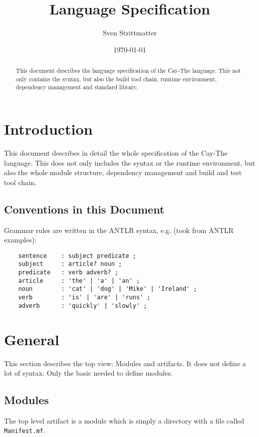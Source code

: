 \documentclass[a4paper,12pt]{article}
\title{Language Specification}
\author{Sven Strittmatter}
\date{\today}
\begin{document}
\maketitle
\begin{abstract}
    This document describes the language specification of the Cay-The language. This not only contains the syntax, but also the build tool chain, runtime environment, dependency management and standard library.
\end{abstract}
\clearpage

\tableofcontents
\clearpage

\section{Introduction}

This document describes in detail the whole specification of the Cay-The language. This does not only includes the syntax or the runtime environment, but also the whole module structure, dependency management and build and test tool chain.

\subsection{Conventions in this Document}

Grammar rules are written in the ANTLR syntax\cite{antlr-docu}, e.g. (took from ANTLR examples\cite{antlr-grammars}):

\begin{verbatim}
    sentence    : subject predicate ;
    subject     : article? noun ;
    predicate   : verb adverb? ;
    article     : 'the' | 'a' | 'an' ;
    noun        : 'cat' | 'dog' | 'Mike' | 'Ireland' ;
    verb        : 'is' | 'are' | 'runs' ;
    adverb      : 'quickly' | 'slowly' ;
\end{verbatim}

\section{General}

This section describes the top view: Modules and artifacts. It does not define a lot of syntax. Only the basic needed to define modules.

\subsection{Modules}

The top level artifact is a module which is simply a directory with a file called \verb|Manifest.mf|.
\end{document}
